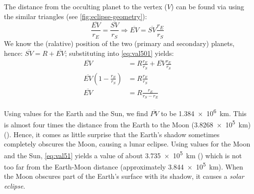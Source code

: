 The distance from the occulting planet to the vertex (\(V\)) can be found via 
using the similar triangles (see \ref{fig:eclipse-geometry}):
\begin{equation}
    \label{eq:val501}
    \frac{\overline{EV}}{r_{E}} = \frac{\overline{SV}}{r_S} \Rightarrow \overline{EV} = \overline{SV} \frac{r_E}{r_S}
\end{equation}
We know the (ralative) position of the two (primary and secondary) planets, hence:
\(\overline{SV} = R + \overline{EV}\); substituting into \ref{eq:val501} yields:
\begin{align*}
    \label{eq:val51}
    \overline{EV} &= R \frac{r_E}{r_S} + \overline{EV} \frac{r_E}{r_S} \\
    \overline{EV} (1-\frac{r_E}{r_S}) &= R \frac{r_E}{r_S} \\
    \overline{EV} &= R \frac{r_E}{r_S - r_E}
\end{align*}

Using values for the Earth and the Sun, we find \(\overline{PV}\) to 
be \SI{1.384e6}{\km}. This is almost four times the distance from the 
Earth to the Moon (\SI{3.8268e5}{\km}) (\cite{Vallado}). Hence, it comes as little surprise 
that the Earth's shadow sometimes completely obscures the Moon, causing a 
lunar eclipse. Using values for the Moon and the Sun, 
\ref{eq:val51} yields a value of about \SI{3.735e5}{\km} (\cite{Vallado}) 
which is not too far from the Earth-Moon distance (approximately 
\SI{3.844e5}{\km}). When the Moon obscures part of the Earth's surface with its 
shadow, it causes a \emph{solar eclipse}.
\fi